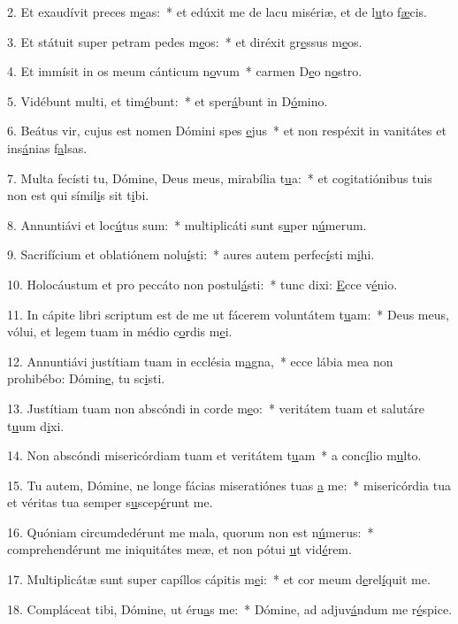 2. Et exaudívit preces m\uline{e}as:~* et edúxit me de lacu misériæ, et de l\uline{u}to f\uline{æ}cis.\par 
3. Et státuit super petram pedes m\uline{e}os:~* et diréxit gr\uline{e}ssus m\uline{e}os.\par 
4. Et immísit in os meum cánticum n\uline{o}vum~* carmen D\uline{e}o n\uline{o}stro.\par 
5. Vidébunt multi, et tim\uline{é}bunt:~* et sper\uline{á}bunt in D\uline{ó}mino.\par 
6. Beátus vir, cujus est nomen Dómini spes \uline{e}jus~* et non respéxit in vanitátes et ins\uline{á}nias f\uline{a}lsas.\par 
7. Multa fecísti tu, Dómine, Deus meus, mirabília t\uline{u}a:~* et cogitatiónibus tuis non est qui símil\uline{i}s sit t\uline{i}bi.\par 
8. Annuntiávi et loc\uline{ú}tus sum:~* multiplicáti sunt s\uline{u}per n\uline{ú}merum.\par 
9. Sacrifícium et oblatiónem nolu\uline{í}sti:~* aures autem perfec\uline{í}sti m\uline{i}hi.\par 
10. Holocáustum et pro peccáto non postul\uline{á}sti:~* tunc dixi: \uline{E}cce v\uline{é}nio.\par 
11. In cápite libri scriptum est de me ut fácerem voluntátem t\uline{u}am:~* Deus meus, vólui, et legem tuam in médio c\uline{o}rdis m\uline{e}i.\par 
12. Annuntiávi justítiam tuam in ecclésia m\uline{a}gna,~* ecce lábia mea non prohibébo: Dómin\uline{e}, tu sc\uline{i}sti.\par 
13. Justítiam tuam non abscóndi in corde m\uline{e}o:~* veritátem tuam et salutáre t\uline{u}um d\uline{i}xi.\par 
14. Non abscóndi misericórdiam tuam et veritátem t\uline{u}am~* a conc\uline{í}lio m\uline{u}lto.\par 
15. Tu autem, Dómine, ne longe fácias miseratiónes tuas \uline{a} me:~* misericórdia tua et véritas tua semper s\uline{u}scep\uline{é}runt me.\par 
16. Quóniam circumdedérunt me mala, quorum non est n\uline{ú}merus:~* comprehendérunt me iniquitátes meæ, et non pótui \uline{u}t vid\uline{é}rem.\par 
17. Multiplicátæ sunt super capíllos cápitis m\uline{e}i:~* et cor meum d\uline{e}rel\uline{í}quit me.\par 
18. Compláceat tibi, Dómine, ut éru\uline{a}s me:~* Dómine, ad adjuv\uline{á}ndum me r\uline{é}spice.\par 
